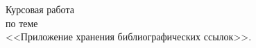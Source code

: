 \begin{titlepage}
\begin{center}
    \huge{Курсовая работа}\\
    \huge{по теме}\\
    \huge{<<Приложение хранения библиографических ссылок>>.}\\
\end{center}











\begin{center}



\end{center}
\end{titlepage}
